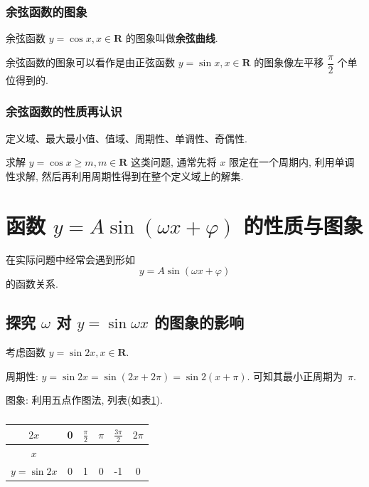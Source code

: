 \documentclass[titlepage]{ctexart}
\begin{document}
\subsubsection{余弦函数的图象}

余弦函数 $y = \cos x, x \in \mathbf{R}$ 的图象叫做\textbf{余弦曲线}.

余弦函数的图象可以看作是由正弦函数 $y = \sin x, x \in \mathbf{R}$ 的图象像左平移 $\dfrac{\pi}{2}$ 个单位得到的.

\subsubsection{余弦函数的性质再认识}

定义域、最大最小值、值域、周期性、单调性、奇偶性.  

求解 $y = \cos x \geqslant m, m\in \mathbf{R}$ 这类问题, 通常先将 $x$ 限定在一个周期内, 利用单调性求解, 然后再利用周期性得到在整个定义域上的解集.


\section{函数 $y = A\sin(\omega x + \varphi)$ 的性质与图象}

在实际问题中经常会遇到形如
\[
y = A\sin(\omega x + \varphi)
\]
的函数关系.

\subsection{探究 $\omega$ 对 $y = \sin \omega x$ 的图象的影响}

考虑函数 $y = \sin 2x, x\in \mathbf{R}$.

周期性: $y = \sin 2x = \sin(2x + 2\pi) = \sin2(x + \pi)$. 可知其最小正周期为~$\pi$.

图象: 利用五点作图法, 列表(如表\ref{tab: y=sin2x}).
\begin{table}[htbp]
    \centering
    \caption{}\label{tab: y=sin2x}
        \begin{tabular}{c|c|c|c|c|c}
            \hline
            $2x$ & 0 & $\frac{\pi}{2}$ & $\pi$ & $\frac{3\pi}{2}$ & $2\pi$ \\
            \hline
            $x$  & & & & & \\
            \hline
            $y = \sin2x$ & 0 & 1 & 0 & -1 & 0 \\
            \hline
        \end{tabular}
\end{table}
\end{document}
